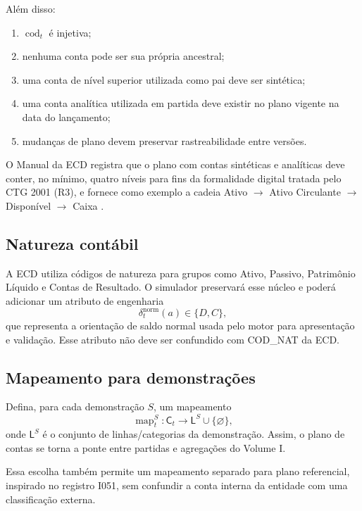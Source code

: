 \documentclass[11pt,a4paper]{article}
\newcommand{\cod}{\operatorname{cod}}
\newcommand{\map}{\operatorname{map}}
\begin{document}
Além disso:
\begin{enumerate}
    \item $\cod_t$ é injetiva;
    \item nenhuma conta pode ser sua própria ancestral;
    \item uma conta de nível superior utilizada como pai deve ser sintética;
    \item uma conta analítica utilizada em partida deve existir no plano vigente na data do lançamento;
    \item mudanças de plano devem preservar rastreabilidade entre versões.
\end{enumerate}

O Manual da ECD registra que o plano com contas sintéticas e analíticas deve conter, no mínimo, quatro níveis para fins da formalidade digital tratada pelo CTG 2001 (R3), e fornece como exemplo a cadeia Ativo $\to$ Ativo Circulante $\to$ Disponível $\to$ Caixa \cite{ECD2026,CFC_NORMAS}.

\subsection{Natureza contábil}

A ECD utiliza códigos de natureza para grupos como Ativo, Passivo, Patrimônio Líquido e Contas de Resultado. O simulador preservará esse núcleo e poderá adicionar um atributo de engenharia
\begin{equation}
\delta^{\mathrm{norm}}_t(a)\in\{D,C\},
\end{equation}
que representa a orientação de saldo normal usada pelo motor para apresentação e validação. Esse atributo não deve ser confundido com COD\_NAT da ECD.

\subsection{Mapeamento para demonstrações}

Defina, para cada demonstração $S$, um mapeamento
\begin{equation}
\boxed{
\map_t^S:\mathsf C_t\longrightarrow \mathsf L^S\cup\{\varnothing\},
}
\label{eq:df-map}
\end{equation}
onde $\mathsf L^S$ é o conjunto de linhas/categorias da demonstração. Assim, o plano de contas se torna a ponte entre partidas e agregações do Volume I.

Essa escolha também permite um mapeamento separado para plano referencial, inspirado no registro I051, sem confundir a conta interna da entidade com uma classificação externa.
\end{document}
